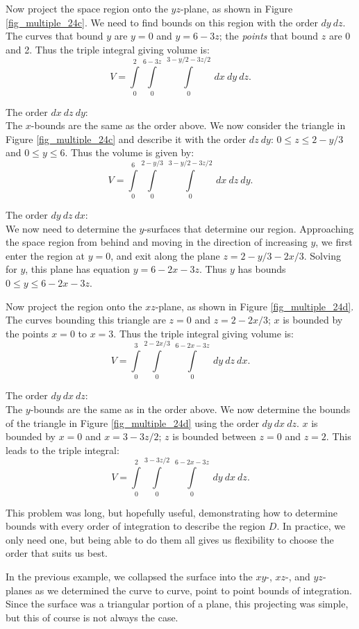 \begin{example}
Now project the space region onto the $yz$-plane, as shown in Figure \ref{fig_multiple_24c}.  We need to find bounds on this region with the order $dy\ dz$. The curves that bound $y$ are $y=0$ and $y=6-3z$; the \textit{points} that bound $z$ are 0 and 2. Thus the triple integral giving volume is:
$$V =\int\limits_0^2\int\limits_0^{6-3z}\ \int\limits_0^{3-y/2-3z/2}\ dx\ dy\ dz.$$

\noindent The order $dx\ dz\ dy$:\\[0.2cm]
The $x$-bounds are the same as the order above. We now consider the triangle in Figure \ref{fig_multiple_24c} and describe it with the order $dz\ dy$: $0\leq z\leq 2-y/3$ and $0\leq y\leq 6$. Thus the volume is given by:
$$V = \int\limits_0^6\int\limits_0^{2-y/3}\ \int\limits_0^{3-y/2-3z/2}\ dx\ dz\ dy.$$

\noindent The order $dy\ dz\ dx$:\\[0.2cm]
We now need to determine the $y$-surfaces that determine our region. Approaching the space region from behind and moving in the direction of increasing $y$, we first enter the region at $y=0$, and exit along the plane $z= 2-y/3-2x/3$. Solving for $y$, this plane has equation $y = 6-2x-3z$. Thus $y$ has bounds $0\leq y\leq 6-2x-3z$. 

Now project the region onto the $xz$-plane, as shown in Figure \ref{fig_multiple_24d}. The curves bounding this triangle are $z=0$ and $z=2-2x/3$; $x$ is bounded by the points $x=0$ to $x=3$. Thus the triple integral giving volume is: 
$$V= \int\limits_0^3\int\limits_0^{2-2x/3}\ \int\limits_0^{6-2x-3z}\ dy\ dz\ dx.$$

\noindent The order $dy\ dx\ dz$:\\[0.2cm]
The $y$-bounds are the same as in the order above. We now determine the bounds of the triangle in Figure \ref{fig_multiple_24d} using the order $dy\ dx\ dz$. $x$ is bounded by $x=0$ and $x=3-3z/2$; $z$ is bounded between $z=0$ and $z=2$. This leads to the triple integral:
$$V = \int\limits_0^2\int\limits_0^{3-3z/2}\ \int\limits_0^{6-2x-3z}\ dy\ dx\ dz.$$

This problem was long, but hopefully useful, demonstrating how to determine bounds with every order of integration to describe the region $D$. In practice, we only need one, but being able to do them all gives us flexibility to choose the order that suits us best.


\end{example}

In the previous example, we collapsed the surface into the $xy$-, $xz$-, and $yz$- planes as we determined the curve to curve, point to point bounds of integration. Since the surface was a triangular portion of a plane, this projecting was simple, but this of course is not always the case. 


